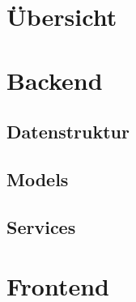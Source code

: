 \section{Übersicht}
\lipsum[10]

\section{Backend}

\subsection{Datenstruktur}
\subsection{Models}
\subsection{Services}

\section{Frontend}

\subsection{}